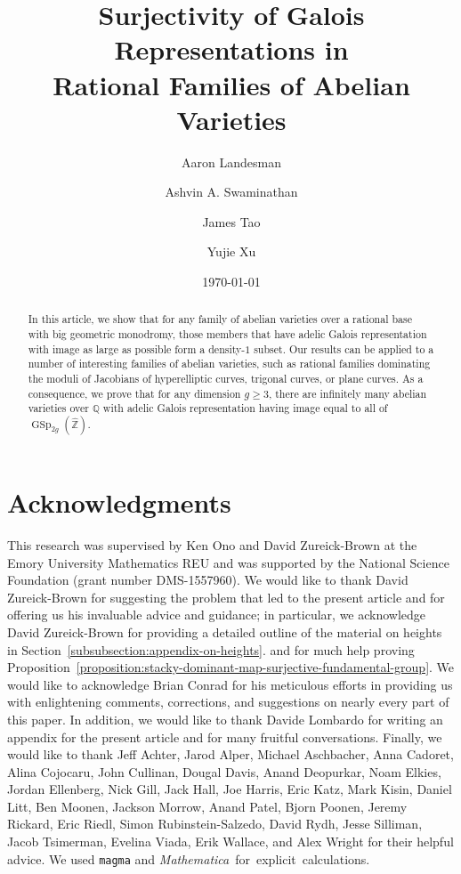 \documentclass[12 pt]{amsart}
\title[Surjectivity of Galois Representations in Families of Abelian Varieties]{Surjectivity of Galois Representations in \\ Rational Families of Abelian Varieties}
\date{\today}
\author[Aaron Landesman]{Aaron Landesman}
\author[Ashvin A. Swaminathan]{Ashvin A. Swaminathan}
\author[James Tao]{James Tao}
\author[Yujie Xu]{Yujie Xu}
\theoremstyle{plain}
\theoremstyle{definition}
\theoremstyle{remark}
\numberwithin{equation}{section}
\begin{document}
\begin{abstract}
	In this article, we show that for any family of abelian varieties over a rational base with big geometric monodromy, those members that have adelic Galois representation with image as large as possible form a density-$1$ subset. Our results can be applied to a number of interesting families of abelian varieties, such as rational families dominating the moduli of Jacobians of hyperelliptic curves, trigonal curves, or plane curves.
As a consequence, we prove that for any dimension $g \geq 3$, there are infinitely many abelian varieties over $\mathbb Q$ with adelic
Galois representation having image equal to all of $\operatorname{GSp}_{2g}(\widehat{\mathbb Z})$.
\end{abstract}


\maketitle






\appendix


\section*{Acknowledgments}

\noindent This research was supervised by Ken Ono and David Zureick-Brown at the Emory University Mathematics REU and was supported by the National Science Foundation (grant number DMS-1557960). We would like to thank David Zureick-Brown for suggesting the problem that led to the present article and for offering us his invaluable advice and guidance; in particular, we acknowledge David Zureick-Brown for providing a detailed outline of the material on heights in Section~\ref{subsubsection:appendix-on-heights}.
and for much help proving
Proposition~\ref{proposition:stacky-dominant-map-surjective-fundamental-group}. We would like to acknowledge Brian Conrad for his meticulous efforts in providing us with enlightening comments, corrections, and suggestions on nearly every part of this paper. In addition, we would like to thank Davide Lombardo for writing an appendix for the present article and for many fruitful conversations. Finally, we would like to thank Jeff Achter, Jarod Alper, Michael Aschbacher, Anna Cadoret, Alina Cojocaru, John Cullinan, Dougal Davis, Anand Deopurkar, Noam Elkies, Jordan Ellenberg, Nick Gill, Jack Hall, Joe Harris, Eric Katz, Mark Kisin, Daniel Litt, Ben Moonen, Jackson Morrow, Anand Patel, Bjorn Poonen, Jeremy Rickard, Eric Riedl, Simon Rubinstein-Salzedo, David Rydh, Jesse Silliman, Jacob Tsimerman, Evelina Viada, Erik Wallace, and Alex Wright for their helpful advice. We used {\tt magma} and \mbox{\emph{Mathematica} for explicit calculations.}



\end{document}
